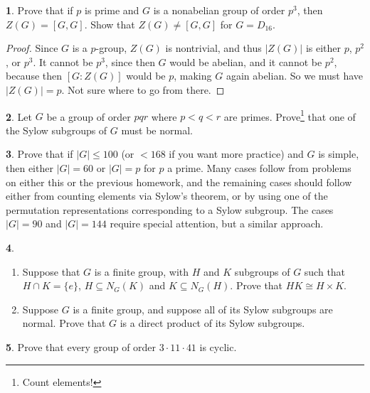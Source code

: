 \documentclass[12pt]{article}
\theoremstyle{definition}
\newtheorem{ex}{}
\begin{document}
\begin{ex}
	Prove that if $p$ is prime and $G$ is a nonabelian group of order $p^3$, then $Z(G) = [G,G]$.
	Show that $Z(G) \neq [G,G]$ for $G = D_{16}$.
\end{ex}
\begin{proof}
  Since $G$ is a $p$-group, $Z(G)$ is nontrivial, and thus $|Z(G)|$ is either $p$, $p^2$, or $p^3$.
  It cannot be $p^3$, since then $G$ would be abelian, and it cannot be $p^2$, because then $[G : Z(G)]$ would be $p$, making $G$ again abelian.
  So we must have $|Z(G)| = p$.
  Not sure where to go from there.
\end{proof}

\begin{ex}
	Let $G$ be a group of order $pqr$ where $p < q < r$ are primes.  Prove\footnote{Count elements!}
	that one of the Sylow subgroups of $G$ must be normal.

\end{ex}

\begin{ex}
	Prove that if $|G| \leq 100$ (or $< 168$ if you want more
	practice) and $G$ is simple, then either $|G| = 60$ or $|G| = p$ for
	$p$ a prime.  Many cases follow from problems on either this or the
	previous homework, and the remaining cases should follow either from
	counting elements via Sylow's theorem, or by using one of the
	permutation representations corresponding to a Sylow subgroup.  The
	cases $|G| = 90$ and $|G| = 144$ require special attention, but a
	similar approach.

\end{ex}

\begin{ex}\
	\begin{enumerate}

		\item Suppose that $G$ is a finite group, with $H$ and $K$
		      subgroups of $G$ such that $H \cap K = \{e\}$, $H \subseteq N_G(K)$ and
		      $K \subseteq N_G(H)$.  Prove that $HK \cong H \times K$.

		\item Suppose $G$ is a finite group, and suppose all of its Sylow subgroups are normal.
		      Prove that $G$ is a direct product of its Sylow subgroups.

	\end{enumerate}

\end{ex}

\begin{ex}
	Prove that every group of order $3\cdot11\cdot41$ is cyclic.

\end{ex}
\end{document}
